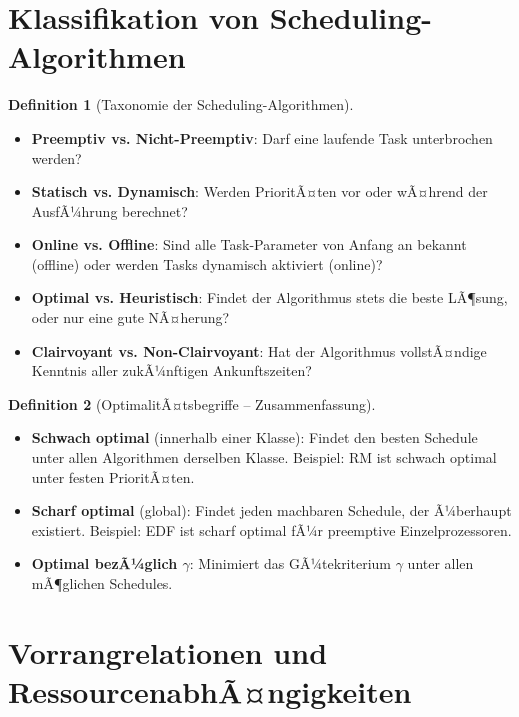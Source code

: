 ﻿\documentclass[a4paper,12pt]{report}
\theoremstyle{definition}
\newtheorem{definition}{Definition}[chapter]
\begin{document}
\section{Klassifikation von Scheduling-Algorithmen}

\begin{definition}[Taxonomie der Scheduling-Algorithmen]
	\begin{itemize}
		\item \textbf{Preemptiv vs. Nicht-Preemptiv}: Darf eine laufende Task
		      unterbrochen werden?
		\item \textbf{Statisch vs. Dynamisch}: Werden PrioritÃ¤ten vor oder
		      wÃ¤hrend der AusfÃ¼hrung berechnet?
		\item \textbf{Online vs. Offline}: Sind alle Task-Parameter von Anfang
		      an bekannt (offline) oder werden Tasks dynamisch aktiviert (online)?
		\item \textbf{Optimal vs. Heuristisch}: Findet der Algorithmus stets
		      die beste LÃ¶sung, oder nur eine gute NÃ¤herung?
		\item \textbf{Clairvoyant vs. Non-Clairvoyant}: Hat der Algorithmus
		      vollstÃ¤ndige Kenntnis aller zukÃ¼nftigen Ankunftszeiten?
	\end{itemize}
\end{definition}

\begin{definition}[OptimalitÃ¤tsbegriffe -- Zusammenfassung]
	\label{def:optimalitaet}
	\begin{itemize}
		\item \textbf{Schwach optimal} (innerhalb einer Klasse): Findet den
		      besten Schedule unter allen Algorithmen derselben Klasse.
		      Beispiel: RM ist schwach optimal unter festen PrioritÃ¤ten.
		\item \textbf{Scharf optimal} (global): Findet jeden machbaren Schedule,
		      der Ã¼berhaupt existiert. Beispiel: EDF ist scharf optimal fÃ¼r
		      preemptive Einzelprozessoren.
		\item \textbf{Optimal bezÃ¼glich $\gamma$}: Minimiert das GÃ¼tekriterium
		      $\gamma$ unter allen mÃ¶glichen Schedules.
	\end{itemize}
\end{definition}

\section{Vorrangrelationen und RessourcenabhÃ¤ngigkeiten}
\end{document}
